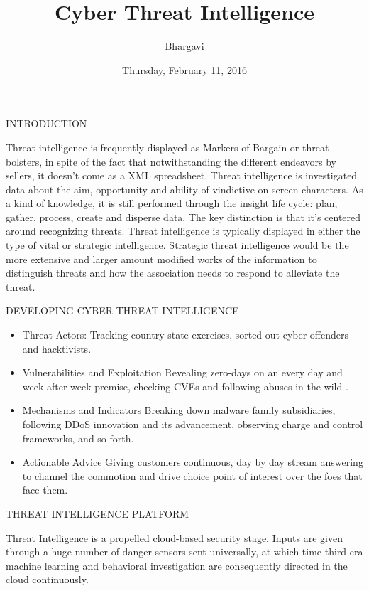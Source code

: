 \documentclass{article}
\title{Cyber Threat Intelligence}
\author{Bhargavi}
\date{Thursday, February 11, 2016}
\begin{document}
\maketitle 
INTRODUCTION


Threat intelligence is frequently displayed as Markers of Bargain or threat bolsters, in spite of the fact that notwithstanding the different endeavors by sellers, it doesn't come as a XML spreadsheet. Threat intelligence is investigated data about the aim, opportunity and ability of vindictive on-screen characters. As a kind of knowledge, it is still performed through the insight life cycle: plan, gather, process, create and disperse data. The key distinction is that it's centered around recognizing threats. Threat intelligence is typically displayed in either the type of vital or strategic intelligence. Strategic threat intelligence would be the more extensive and larger amount modified works of the information to distinguish threats and how the association needs to respond to alleviate the threat.



DEVELOPING CYBER THREAT INTELLIGENCE

\begin{itemize}
\item Threat Actors:
Tracking country state exercises, sorted out cyber offenders and hacktivists.
\end{itemize}
\begin{itemize}
\item Vulnerabilities and Exploitation
Revealing zero-days on an every day and week after week premise, checking CVEs and following abuses in the wild .
\end{itemize}
\begin{itemize}
\item  Mechanisms and Indicators
Breaking down malware family subsidiaries, following DDoS innovation and its advancement, observing charge and control frameworks, and so forth.
\end{itemize}
\begin{itemize}
\item Actionable Advice
Giving customers continuous, day by day stream answering to channel the commotion and drive choice point of interest over the foes that face them.
\end{itemize}

THREAT INTELLIGENCE PLATFORM


 
Threat Intelligence is a propelled cloud-based security stage. Inputs are given through a huge number of danger sensors sent universally, at which time third era machine learning and behavioral investigation are consequently directed in the cloud continuously.
\end{document}
